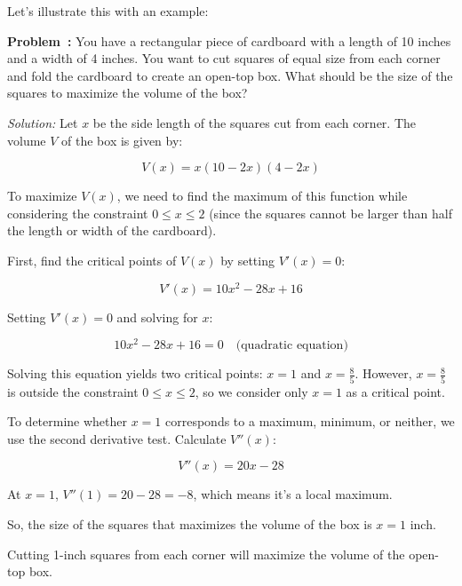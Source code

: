 \documentclass[a4paper,12pt]{book}
\newcounter{problem}
\newenvironment{problem}[1][\theproblem]
{\refstepcounter{problem}\par\medskip\noindent\textbf{Problem~#1:} \rmfamily}{\medskip}
\newenvironment{solution}[1][]
{\par\noindent\textit{Solution:} \rmfamily}{\medskip}
\newcounter{example}
\begin{document}
Let's illustrate this with an example:

\begin{problem}
You have a rectangular piece of cardboard with a length of 10 inches and a width of 4 inches. You want to cut squares of equal size from each corner and fold the cardboard to create an open-top box. What should be the size of the squares to maximize the volume of the box?
\end{problem}

\begin{solution}
Let \(x\) be the side length of the squares cut from each corner. The volume \(V\) of the box is given by:

\[
V(x) = x(10 - 2x)(4 - 2x)
\]

To maximize \(V(x)\), we need to find the maximum of this function while considering the constraint \(0 \leq x \leq 2\) (since the squares cannot be larger than half the length or width of the cardboard).

First, find the critical points of \(V(x)\) by setting \(V'(x) = 0\):

\[
V'(x) = 10x^2 - 28x + 16
\]

Setting \(V'(x) = 0\) and solving for \(x\):

\[
10x^2 - 28x + 16 = 0 \quad \text{(quadratic equation)}
\]

Solving this equation yields two critical points: \(x = 1\) and \(x = \frac{8}{5}\). However, \(x = \frac{8}{5}\) is outside the constraint \(0 \leq x \leq 2\), so we consider only \(x = 1\) as a critical point.

To determine whether \(x = 1\) corresponds to a maximum, minimum, or neither, we use the second derivative test. Calculate \(V''(x)\):

\[
V''(x) = 20x - 28
\]

At \(x = 1\), \(V''(1) = 20 - 28 = -8\), which means it's a local maximum.

So, the size of the squares that maximizes the volume of the box is \(x = 1\) inch.

\begin{center}
\end{center}

Cutting 1-inch squares from each corner will maximize the volume of the open-top box.
\end{solution}
\end{document}
